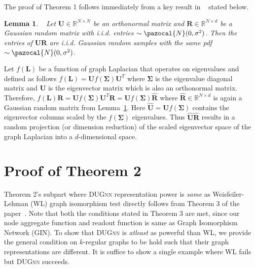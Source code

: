 \documentclass{article}
\newtheorem{lemma}{Lemma}
\newcommand{\Na}{\pazocal{N}}
\begin{document}
The proof of Theorem 1 follows immediately from a key result in ~\cite{paratte2016fast}  stated below.

\begin{lemma}~\cite{paratte2016fast} \label{lemma:projection} 
	Let $\mathbf{U} \in \mathbb{R}^{N\times N}$ be an orthonormal matrix and $\mathbf{R} \in \mathbb{R}^{N\times d}$  be a Gaussian random matrix with i.i.d. entries $\sim \Na(0, \sigma^2)$. Then the entries of $\mathbf{U} \mathbf{R}$ are i.i.d. Gaussian random samples with the same pdf  $\sim \Na(0, \sigma^2)$.
\end{lemma}

Let $f(\mathbf{L})$ be a function of graph Laplacian that operates on eigenvalues and defined as follows $f(\mathbf{L})=\mathbf{U}f(\mathbf{\Sigma})\mathbf{U}^{T}$  where $\mathbf{\Sigma}$ is the eigenvalue diagonal matrix  and $\mathbf{U}$ is the eigenvector matrix which is also an orthonormal matrix. Therefore, $f(\mathbf{L})  \mathbf{R}=\mathbf{U}f(\mathbf{\Sigma})\mathbf{U}^{T}  \mathbf{R} =\mathbf{U}f(\mathbf{\Sigma})  \mathbf{\widehat{R}} $ where $\mathbf{\widehat{R}} \in \mathbb{R}^{N\times d}$ is again a  Gaussian random matrix from Lemma~\ref{lemma:projection}. Here $\mathbf{\widehat{U}} = \mathbf{U}f(\mathbf{\Sigma})$ contains the eigenvector columns  scaled by the $f(\mathbf{\Sigma})$ eigenvalues. Thus $\mathbf{\widehat{U}} \mathbf{\widehat{R}}$ results in a random projection  (or dimension reduction) of the
scaled eigenvector space of the graph Laplacian into a $d$-dimensional space. 


\section{Proof of Theorem 2}

Theorem 2's subpart where \textsc{DUGnn} representation power is \emph{same} as  Weisfeiler-Lehman (WL) graph isomorphism test  directly follows from  Theorem 3 of the paper~\cite{xu2018powerful}. Note that both the conditions  stated in Theorem 3 are met,  since our node aggregate function and readout function is same as  Graph Isomorphism Network (GIN). To show that \textsc{DUGnn} is \emph{atleast} as powerful than WL, we provide the general condition on $k$-regular graphs to be hold such that their graph representations are different. It is suffice   to show  a single example where WL fails but \textsc{DUGnn} succeeds.
\end{document}
